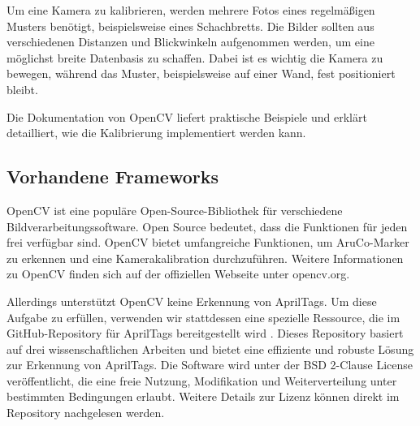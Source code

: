 Um eine Kamera zu kalibrieren, werden mehrere Fotos eines regelmäßigen Musters 
benötigt, beispielsweise eines Schachbretts. Die Bilder sollten aus verschiedenen 
Distanzen und Blickwinkeln aufgenommen werden, um eine möglichst breite Datenbasis 
zu schaffen. Dabei ist es wichtig die Kamera zu bewegen, während das Muster, 
beispielsweise auf einer Wand, fest positioniert bleibt.

Die Dokumentation von OpenCV \cite{opencv_calibration_tutorial} liefert praktische 
Beispiele und erklärt detailliert, wie die Kalibrierung implementiert werden 
kann.


\subsection{Vorhandene Frameworks}
OpenCV ist eine populäre Open-Source-Bibliothek für verschiedene Bildverarbeitungssoftware.
Open Source bedeutet, dass die Funktionen für jeden frei verfügbar sind. OpenCV bietet 
umfangreiche Funktionen, um AruCo-Marker zu erkennen und eine Kamerakalibration durchzuführen.
Weitere Informationen zu OpenCV finden sich auf der offiziellen Webseite unter opencv.org.

Allerdings unterstützt OpenCV keine Erkennung von AprilTags. Um diese Aufgabe zu erfüllen, verwenden 
wir stattdessen eine spezielle Ressource, die im GitHub-Repository für AprilTags bereitgestellt 
wird \cite{apriltag_github}. Dieses Repository basiert auf drei wissenschaftlichen Arbeiten 
\cite{olson2011tags} \cite{wang2016iros} \cite{krogius2019iros} und bietet eine effiziente 
und robuste Lösung zur Erkennung von AprilTags. Die Software wird unter der BSD 2-Clause License 
veröffentlicht, die eine freie Nutzung, Modifikation und Weiterverteilung unter bestimmten Bedingungen 
erlaubt. Weitere Details zur Lizenz können direkt im Repository nachgelesen werden.